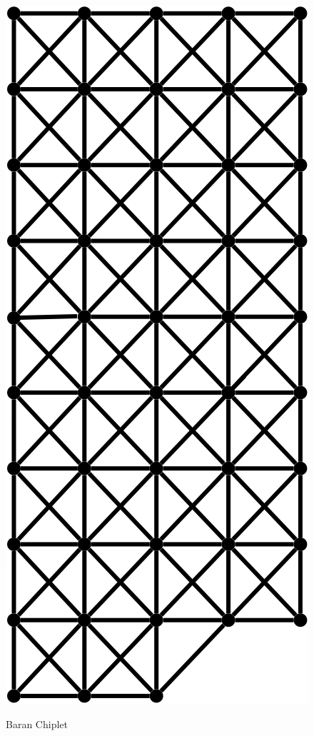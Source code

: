 \documentclass[../HFT-main.tex]{subfiles}
\begin{document}
\begin{marginfigure}
  \includegraphics[width=0.6\linewidth]{../figures/Baran-Chiplet.png}
  \caption{Baran Chiplet}
    \vspace{20pt}
\end{marginfigure}

\clearpage
\end{document}
